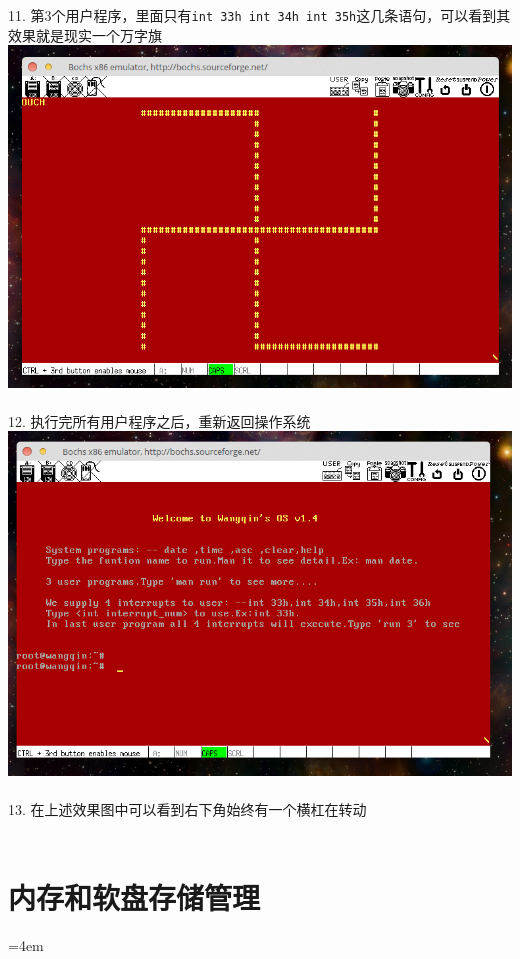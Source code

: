 \documentclass[a4paper]{article}
\begin{document}
{11. 第3个用户程序，里面只有\verb|int 33h int 34h int 35h|这几条语句，可以看到其效果就是现实一个万字旗
{\center\includegraphics[scale=0.5]{Illustrations/usr3.png}}\\\\
12. 执行完所有用户程序之后，重新返回操作系统
{\center\includegraphics[scale=0.5]{Illustrations/backos.png}}\\\\
13. 在上述效果图中可以看到右下角始终有一个横杠在转动\\\\
}

\section*{ 内存和软盘存储管理}
\hangindent=4em 
\end{document}
